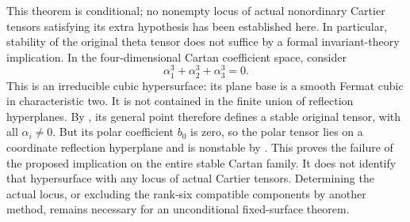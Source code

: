 \begin{remark}
\label{rem:nonordinary-polar-stability-gap-candidate}
This theorem is conditional; no nonempty locus of actual nonordinary
Cartier tensors satisfying its extra hypothesis has been established
here. In particular, stability of the original theta tensor does
not suffice by a formal invariant-theory implication.
In the four-dimensional Cartan coefficient space, consider
\[
                    \alpha_1^3+\alpha_2^3+\alpha_3^3=0.
\]
This is an irreducible cubic hypersurface: its plane base is a smooth
Fermat cubic in characteristic two. It is not contained in the finite
union of reflection hyperplanes. By
\citet[Proposition~2.10]{RainsSam2018Trivectors}, its general point
therefore defines a stable original tensor, with all $\alpha_i\ne0$.
But its polar coefficient $b_0$ is zero, so the polar tensor lies on
a coordinate reflection hyperplane and is nonstable by
\citet[Proposition~2.9]{RainsSam2018Trivectors}.
This proves the failure of the proposed implication on the entire
stable Cartan family. It does not identify that hypersurface with
any locus of actual Cartier tensors. Determining the actual locus,
or excluding the rank-six compatible components by another method,
remains necessary for an unconditional fixed-surface theorem.
\end{remark}
